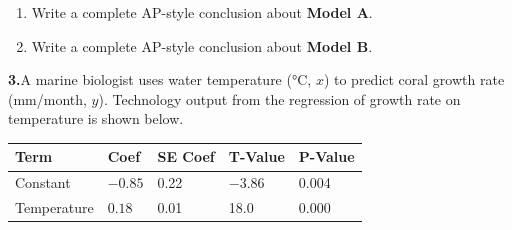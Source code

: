 \documentclass[10pt]{article}
\begin{document}
\begin{enumerate}[label=\textbf{(\alph*)}, leftmargin=2em, itemsep=0.18in]

  \item Write a complete AP-style conclusion about \textbf{Model A}.\\[8pt]

  \item Write a complete AP-style conclusion about \textbf{Model B}.\\[8pt]

\end{enumerate}

\vspace{0.18in}

\noindent\textbf{3.}\enspace A marine biologist uses water temperature (°C, $x$) to predict
coral growth rate (mm/month, $y$). Technology output from the regression of growth rate on
temperature is shown below.

\vspace{8pt}
\renewcommand{\arraystretch}{1.4}
\begin{tabularx}{\linewidth}{@{} l X X X X @{}}
\rowcolor{sky}
\textbf{Term} & \textbf{Coef} & \textbf{SE Coef} & \textbf{T-Value} & \textbf{P-Value} \\
\midrule
Constant       & $-0.85$ & 0.22 & $-3.86$ & 0.004 \\
Temperature    & $0.18$  & 0.01 &  18.0  & 0.000 \\
\end{tabularx}

\vspace{10pt}
\end{document}

